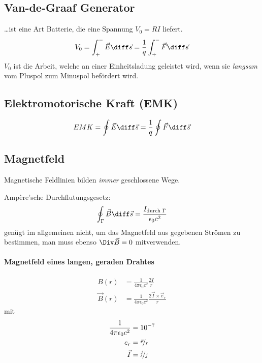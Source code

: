 	\subsection{Van-de-Graaf Generator} %
		…ist eine Art Batterie, die eine Spannung $V_0 = RI$ liefert.
		\begin{equation*}
			V_0 = \int_+^- \vec E \diff \vec s = \frac{1}{q} \int_+^- \vec F \diff \vec s
		\end{equation*}
		$V_0$ ist die Arbeit, welche an einer Einheitsladung geleistet wird, wenn sie \emph{langsam} vom Pluspol zum Minuspol befördert wird.
	\subsection{Elektromotorische Kraft (EMK)} %
		\begin{equation*}
			EMK = \oint \vec E \diff \vec s = \frac{1}{q} \oint \vec F \diff \vec s
		\end{equation*}
	\subsection{Magnetfeld} %
		Magnetische Feldlinien bilden \emph{immer} geschlossene Wege.
		
		Ampère'sche Durchflutungsgesetz:
		\begin{equation*}
			\oint_\Gamma \vec B \diff \vec s = \frac{I_{\text{durch $\Gamma$}}}{\epsilon_0 c^2}
		\end{equation*}
		genügt im allgemeinen nicht, um das Magnetfeld aus gegebenen Strömen zu bestimmen, man muss ebenso $\Div\vec B = 0$ mitverwenden.
		
		\paragraph{Magnetfeld eines langen, geraden Drahtes} %
			\begin{align*}
				B(r) &= \frac{1}{4\pi\epsilon_0 c^2} \frac{2I}{r} \\
				\vec B(r) &= \frac{1}{4\pi\epsilon_0 c^2} \frac{2\vec I \times \vec e_r}{r}
			\end{align*}
			mit
			\begin{align*}
				\frac{1}{4\pi\epsilon_0 c^2} &= 10^{-7} \\
				e_r &= \nicefrac{\vec r}{r} \\
				\vec I &= \nicefrac{\vec j}{j}
			\end{align*}
			
